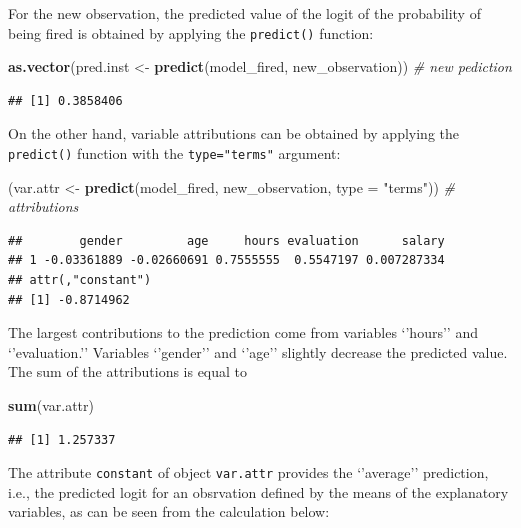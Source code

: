 \documentclass[12pt,]{krantz}
\newenvironment{Shaded}{\begin{snugshade}}{\end{snugshade}}
\newcommand{\CommentTok}[1]{\textcolor[rgb]{0.56,0.35,0.01}{\textit{#1}}}
\newcommand{\DataTypeTok}[1]{\textcolor[rgb]{0.13,0.29,0.53}{#1}}
\newcommand{\KeywordTok}[1]{\textcolor[rgb]{0.13,0.29,0.53}{\textbf{#1}}}
\newcommand{\NormalTok}[1]{#1}
\newcommand{\StringTok}[1]{\textcolor[rgb]{0.31,0.60,0.02}{#1}}
\theoremstyle{definition}
\theoremstyle{definition}
\theoremstyle{definition}
\theoremstyle{remark}
\begin{document}
For the new observation, the predicted value of the logit of the
probability of being fired is obtained by applying the
\texttt{predict()} function:

\begin{Shaded}
\begin{Highlighting}[]
\KeywordTok{as.vector}\NormalTok{(pred.inst <-}\StringTok{ }\KeywordTok{predict}\NormalTok{(model_fired, new_observation)) }\CommentTok{# new pediction}
\end{Highlighting}
\end{Shaded}

\begin{verbatim}
## [1] 0.3858406
\end{verbatim}

On the other hand, variable attributions can be obtained by applying the
\texttt{predict()} function with the \texttt{type="terms"} argument:

\begin{Shaded}
\begin{Highlighting}[]
\NormalTok{(var.attr <-}\StringTok{ }\KeywordTok{predict}\NormalTok{(model_fired, new_observation, }\DataTypeTok{type =} \StringTok{"terms"}\NormalTok{)) }\CommentTok{# attributions}
\end{Highlighting}
\end{Shaded}

\begin{verbatim}
##        gender         age     hours evaluation      salary
## 1 -0.03361889 -0.02660691 0.7555555  0.5547197 0.007287334
## attr(,"constant")
## [1] -0.8714962
\end{verbatim}

The largest contributions to the prediction come from variables
`'hours'' and `'evaluation.'' Variables `'gender'' and `'age'' slightly
decrease the predicted value. The sum of the attributions is equal to

\begin{Shaded}
\begin{Highlighting}[]
\KeywordTok{sum}\NormalTok{(var.attr)}
\end{Highlighting}
\end{Shaded}

\begin{verbatim}
## [1] 1.257337
\end{verbatim}

The attribute \texttt{constant} of object \texttt{var.attr} provides the
`'average'' prediction, i.e., the predicted logit for an obsrvation
defined by the means of the explanatory variables, as can be seen from
the calculation below:
\end{document}
